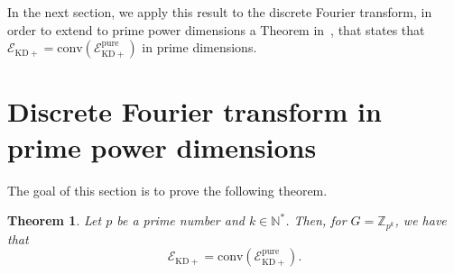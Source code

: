 \documentclass[a4paper, notitlepage, 11pt]{article}
\numberwithin{equation}{section}
\newcommand{\mcl}[1]{\ensuremath{\mathcal{#1}}}
\newcommand{\EcalKDC}{{\mcl E}_{\mathrm{KD+}}}
\newcommand{\EcalKDCpu}{{\mcl E}_{\mathrm{KD+}}^{\mathrm{pure}}}
\newcommand{\N}{\mathbb{N}}
\newcommand{\Z}{\mathbb{Z}}
\newcommand{\conv}[1]{\mathrm{conv}\left(#1\right)}
\newtheorem{Theorem}{Theorem}[section]
\begin{document}
In the next section, we apply this result to the discrete Fourier transform, in order to extend to prime power dimensions a Theorem in~\cite{langrenez2023characterizing2}, that states that $\EcalKDC = \conv{\EcalKDCpu}$ in prime dimensions.

\section{Discrete Fourier transform in prime power dimensions}\label{sec:DFtprimepower}
The goal of this section is to prove the following theorem.
\begin{Theorem}\label{thm:primepowers}
    Let $p$ be a prime number and $k\in \N^{*}$. Then, for $G=\Z_{p^{k}}$, we have that 
    \begin{equation}
     \EcalKDC=\conv{\EcalKDCpu}. 
    \end{equation}
\end{Theorem}
\end{document}
